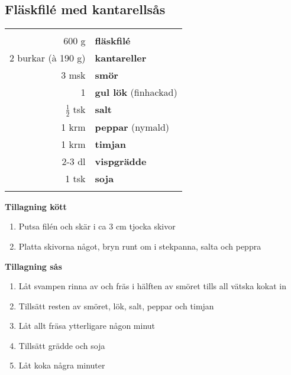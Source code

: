 \clearpage

\subsection{Fläskfilé med kantarellsås}

\begin{table}[H]
	\begin{tabular}{rl}
	\hline
	&\\
		600 g & \textbf{fläskfilé}\\
		2 burkar (à 190 g) & \textbf{kantareller}\\
		3 msk & \textbf{smör}\\
		1 & \textbf{gul lök} (finhackad)\\
		$\frac{1}{2}$ tsk & \textbf{salt}\\
		1 krm & \textbf{peppar} (nymald)\\
		1 krm & \textbf{timjan}\\
		2-3 dl & \textbf{vispgrädde}\\
		1 tsk & \textbf{soja}\\
	&\\
	\hline
	\end{tabular}
\end{table}


\begin{multicols*}{2}

\noindent \textbf{Tillagning kött}
\begin{enumerate}
	\itemsep0cm
	\item Putsa filén och skär i ca 3 cm tjocka skivor
	\item Platta skivorna något, bryn runt om i stekpanna, salta och peppra
\end{enumerate}

\noindent \textbf{Tillagning sås}
\begin{enumerate}
	\itemsep0cm
	\item Låt svampen rinna av och fräs i hälften av smöret tills all vätska kokat in
	\item Tillsätt resten av smöret, lök, salt, peppar och timjan
	\item Låt allt fräsa ytterligare någon minut
	\item Tillsätt grädde och soja
	\item Låt koka några minuter
\end{enumerate}

\end{multicols*}

\clearpage